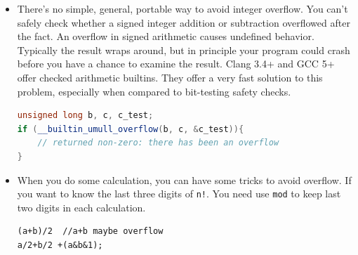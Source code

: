 \documentclass[a4paper,11pt,twoside]{book}
\begin{document}
\begin{itemize}
\begin{enumerate}
		\item Judge it after calculation.
\begin{lstlisting}[numbers = none]
uint32 a,b;
uint32 result = a + b;
if (result < a) //overflow
\end{lstlisting}
	\end{enumerate}
	
	\item There's no simple, general, portable way to avoid integer overflow. You can't safely check whether a signed integer addition or subtraction overflowed after the fact. An overflow in signed arithmetic causes undefined behavior. Typically the result wraps around, but in principle your program could crash before you have a chance to examine the result. Clang 3.4+ and GCC 5+ offer checked arithmetic builtins. They offer a very fast solution to this problem, especially when compared to bit-testing safety checks.
\begin{lstlisting}[frame=single, language=c++]
unsigned long b, c, c_test;
if (__builtin_umull_overflow(b, c, &c_test)){
	// returned non-zero: there has been an overflow
}
\end{lstlisting}
	
	\item When you do some calculation, you can have some tricks to avoid overflow. If you  want to know the last three digits of \texttt{n!}. You need use \texttt{mod} to keep last two digits in each calculation.
\begin{lstlisting}[numbers = none]
(a+b)/2  //a+b maybe overflow
a/2+b/2 +(a&b&1);
\end{lstlisting}
	
\end{itemize}
\end{document}
